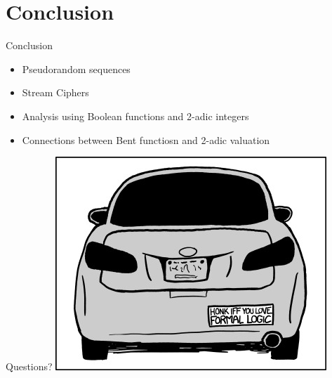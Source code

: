 \documentclass{beamer}
\begin{document}
\section{Conclusion}
\begin{frame}{Conclusion}
  \begin{itemize}
    \item Pseudorandom sequences
    \item Stream Ciphers
    \item Analysis using Boolean functions and 2-adic integers
    \item Connections between Bent functiosn and 2-adic valuation
  \end{itemize}
\end{frame}

\begin{frame}{Questions?}
  \includegraphics[totalheight=.98\textheight]{formal_logic.jpg}
\end{frame}
\end{document}
